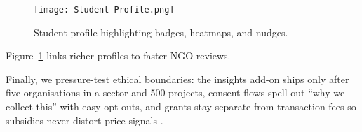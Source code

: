 \begin{figure}[H]
  \centering
  \texttt{[image: Student-Profile.png]}
  \caption{Student profile highlighting badges, heatmaps, and nudges.}
  \label{fig:student-profile}
\end{figure}

Figure~\ref{fig:student-profile} links richer profiles to faster NGO reviews.

Finally, we pressure-test ethical boundaries: the insights add-on ships only after five organisations in a sector and 500 projects, consent flows spell out ``why we collect this'' with easy opt-outs, and grants stay separate from transaction fees so subsidies never distort price signals \citep{Zuboff2019,Srnicek2017}.
